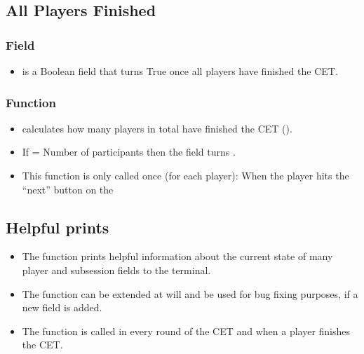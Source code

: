 \documentclass[letterpaper,10pt,english]{sphinxmanual}
\begin{document}
\subsection{All Players Finished}
\label{\detokenize{Subsession_fields:all-players-finished}}

\subsubsection{Field}
\label{\detokenize{Subsession_fields:id1}}\begin{itemize}
\item {} 
 is a Boolean field that turns True once all players have finished the CET.

\end{itemize}


\subsubsection{Function}
\label{\detokenize{Subsession_fields:id2}}\begin{itemize}
\item {} 
 calculates how many players in total have finished the CET ().

\item {} 
If  = Number of participants then the  field turns .

\item {} 
This function is only called once (for each player): When the player hits the “next” button on the {\hyperref[\detokenize{pages:results}]{}}

\end{itemize}


\subsection{Helpful prints}
\label{\detokenize{Subsession_fields:helpful-prints}}\begin{itemize}
\item {} 
The  function prints helpful information about the current state of many player and subsession fields to the terminal.

\item {} 
The function can be extended at will and be used for bug fixing purposes, if a new field is added.

\item {} 
The function is called in every round of the CET and when a player finishes the CET.

\end{itemize}
\end{document}
